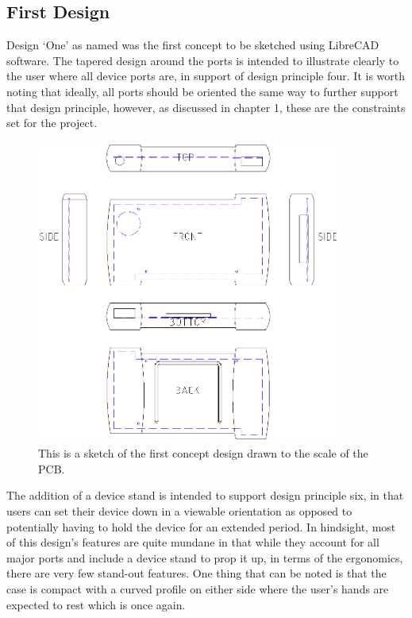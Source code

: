 \subsection{First Design}


Design ‘One’ as named was the first concept to be sketched using LibreCAD software.
The tapered design around the ports is intended to illustrate clearly to the user where all device ports are, in support of design principle four. 
It is worth noting that ideally, all ports should be oriented the same way to further support that design principle, however, as discussed in chapter 1, these are the constraints set for the project.

\begin{figure} [h]
\centering
\includegraphics[width=10cm,height=10cm,keepaspectratio]{Figures/design1_sketch.png}
\caption{This is a sketch of the first concept design drawn to the scale of the PCB.}
\label{fig:Design_1}
\end{figure}

The addition of a device stand is intended to support design principle six, in that users can set their device down in a viewable orientation as opposed to potentially having to hold the device for an extended period.
In hindsight, most of this design’s features are quite mundane in that while they account for all major ports and include a device stand to prop it up, in terms of the ergonomics, there are very few stand-out features. 
One thing that can be noted is that the case is compact with a curved profile on either side where the user’s hands are expected to rest which is once again.

